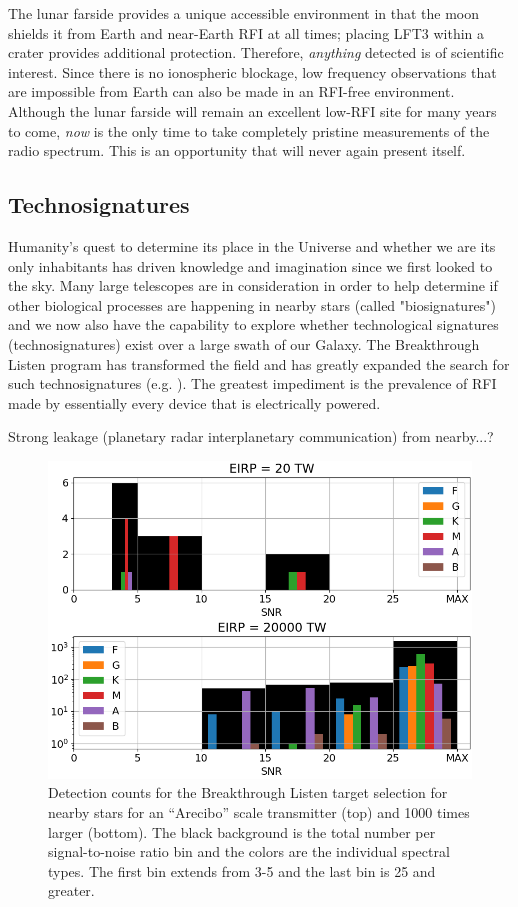 The lunar farside provides a unique accessible environment in that the moon shields it from Earth and near-Earth RFI at all times; placing LFT3 within a crater provides additional protection. Therefore, {\em anything} detected is of scientific interest. Since there is no ionospheric blockage, low frequency observations that are impossible from Earth can also be made in an RFI-free environment. Although the lunar farside will remain an excellent low-RFI site for many years to come, {\em now} is the only time to take completely pristine measurements of the radio spectrum. This is an opportunity that will never again present itself.

\subsection{Technosignatures}
Humanity's quest to determine its place in the Universe and whether we are its only inhabitants has driven knowledge and imagination since we first looked to the sky.  Many large telescopes are in consideration in order to help determine if other biological processes are happening in nearby stars (called "biosignatures") and we now also have the capability to explore whether technological signatures (technosignatures) exist over a large swath of our Galaxy.  The Breakthrough Listen program has transformed the field and has greatly expanded the search for such technosignatures (e.g. \citealt{Enriquez_2017, Price_2020, Gajjar_2021}).  The greatest impediment is the prevalence of RFI made by essentially every device that is electrically powered.

Strong leakage (planetary radar interplanetary communication) from nearby...?
\begin{figure}
    \centering
    \includegraphics[width=0.75\linewidth]{figures/isaacsonetalcounts.png}
    \caption{Detection counts for the Breakthrough Listen target selection for nearby stars \citep{2017PASP..129e4501I} for an ``Arecibo'' scale transmitter (top) and 1000 times larger (bottom).  The black background is the total number per signal-to-noise ratio bin and the colors are the individual spectral types.  The first bin extends from 3-5 and the last bin is 25 and greater.}
    \label{fig:isaacsonetal}
\end{figure}


